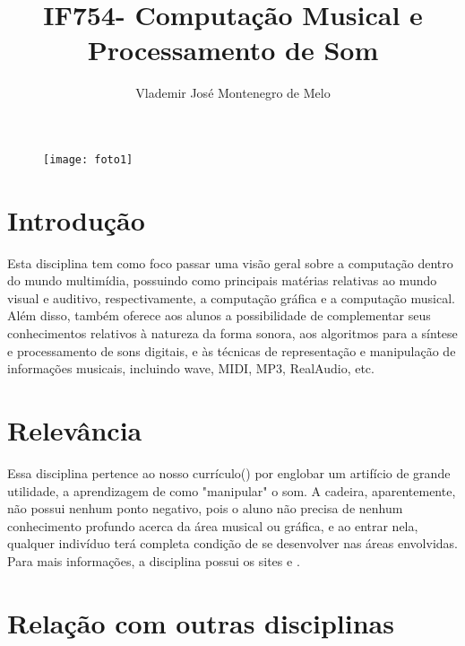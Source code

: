 \documentclass[10pt, a4paper]{article}
\title{IF754- Computação Musical e Processamento de Som}
\author{Vlademir José Montenegro de Melo}
\begin{document}
\maketitle

\begin{figure}[h!]
\centering
\texttt{[image: foto1]}
\label{fig:foto1}
\end{figure}

\section{Introdução}
Esta disciplina tem como foco passar uma visão geral sobre a computação dentro do mundo multimídia, possuindo como principais matérias relativas ao mundo visual e auditivo, respectivamente, a computação gráfica e a computação musical. Além disso, também oferece aos alunos a possibilidade de complementar seus conhecimentos relativos à natureza da forma sonora, aos algoritmos para a síntese e processamento de sons digitais, e às técnicas de representação e manipulação de informações  musicais, incluindo wave, MIDI, MP3, RealAudio, etc.

\section{Relevância}
Essa disciplina pertence ao nosso currículo(\citep{Curriculo}) por englobar um artifício de grande utilidade, a aprendizagem de como "manipular" o som. A cadeira, aparentemente, não possui nenhum ponto negativo, pois o aluno não precisa de nenhum conhecimento profundo acerca da área musical ou gráfica, e ao entrar nela, qualquer indivíduo terá completa condição de se desenvolver nas áreas envolvidas. Para mais informações, a disciplina possui os sites \citep{Site_oficial} e \citep{Site_secundario}.

\section{Relação com outras disciplinas}
\end{document}
